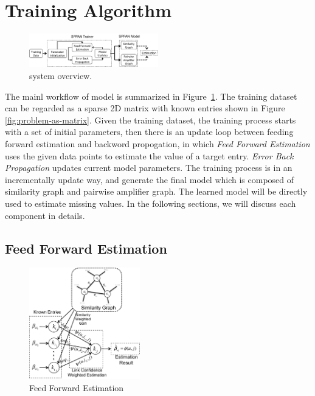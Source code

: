 \section{Training Algorithm}
\label{sec:trainer}

\begin{figure}[!ht]
  \centering  \includegraphics[width=0.5\textwidth]{figures/model.pdf}
  \caption{{\sppan} system overview.}
  \label{fig:model}
\end{figure}

The mainl workflow of {\sppan} model is summarized in
Figure~\ref{fig:model}.  The training dataset can be regarded as a
sparse 2D matrix with known entries shown in Figure
\ref{fig:problem-as-matrix}.  Given the training dataset, the training
process starts with a set of initial parameters, then there is an
update loop between feeding forward estimation and backword
propogation, in which {\it Feed Forward Estimation} uses the given
data points to estimate the value of a target entry.  {\it Error Back
  Propagation} updates current model parameters.  The training process
is in an incrementally update way, and generate the final model which
is composed of similarity graph and pairwise amplifier graph. The
learned {\sppan} model will be directly used to estimate missing values.
In the following sections, we will discuss each component in details.

\subsection{Feed Forward Estimation}
\label{sec:ffe}

\begin{figure}[!ht]
  \centering
  \includegraphics[width=0.43\textwidth]{figures/trainer_feedforward.pdf}
  \caption{Feed Forward Estimation}
  \label{fig:trainer-feedforward}
\end{figure}

